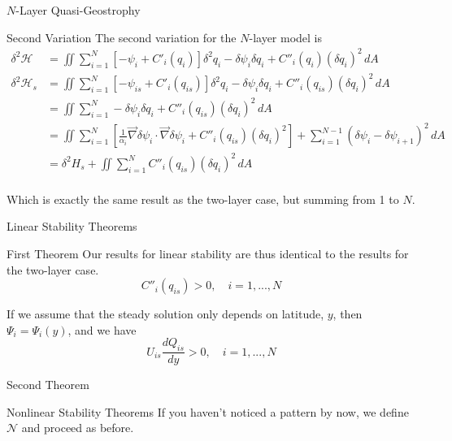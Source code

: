 \documentclass[12pt]{article}
\begin{document}
\begin{section}{$N$-Layer Quasi-Geostrophy}
    \begin{subsection}{Second Variation}
        The second variation for the $N$-layer model is
        \begin{align*}
            \delta^2 \mathcal{H} &= \iint \sum_{i=1}^N \left[ - \psi_i + C'_i(q_i) \right]  \delta^2 q_i  - \delta \psi_i \delta q_i +  C''_i(q_i) (\delta q_i)^2  \, dA \\
            \delta^2 \mathcal{H}_s &= \iint \sum_{i=1}^N \left[ - \psi_{is} + C'_i(q_{is}) \right]  \delta^2 q_i  - \delta \psi_i \delta q_i +  C''_i(q_{is}) (\delta q_i)^2  \, dA \\
            &= \iint \sum_{i=1}^N - \delta \psi_i \delta q_i +  C''_i(q_{is}) (\delta q_i)^2  \, dA \\
            &= \iint \sum_{i=1}^N \left[ \frac{1}{\alpha_i} \vec\nabla\delta\psi_i \cdot \vec\nabla\delta\psi_i + C''_i(q_{is}) (\delta q_i)^2 \right] + \sum_{i=1}^{N-1}(\delta\psi_i - \delta\psi_{i+1})^2 \, dA \\
            &= \delta^2 H_s + \iint \sum_{i=1}^N C''_i(q_{is})(\delta q_i)^2 \, dA \\
        \end{align*}

        Which is exactly the same result as the two-layer case, but summing from 1 to $N$.
    \end{subsection}

    \begin{subsection}{Linear Stability Theorems}
        \begin{subsubsection}{First Theorem}
            Our results for linear stability are thus identical to the results for the two-layer case.
            $$
            C''_i(q_{is}) > 0, \quad i=1,...,N
            $$

            If we assume that the steady solution only depends on latitude, $y$, then $\Psi_i = \Psi_i(y)$, and we have
            $$
            U_{is} \frac{d Q_{is}}{dy} > 0, \quad i=1,...,N
            $$
        \end{subsubsection}
        \begin{subsubsection}{Second Theorem}
        \end{subsubsection}
    \end{subsection}

    \begin{subsection}{Nonlinear Stability Theorems}
        If you haven't noticed a pattern by now, we define $\mathcal{N}$ and proceed as before.


\end{subsection}
\end{section}
\end{document}
